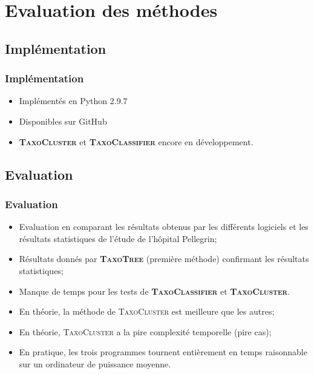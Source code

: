 \documentclass{beamer}
\begin{document}
\section{Evaluation des méthodes}


\subsection{Implémentation}


\begin{frame}
\frametitle{Implémentation}

\begin{itemize}
\item Implémentés en Python 2.9.7
\bigskip
\item Disponibles sur GitHub
\bigskip
\item \textsc{\bf TaxoCluster} et \textsc{\bf TaxoClassifier} encore en développement.
\end{itemize}

\end{frame}

\subsection{Evaluation}


\begin{frame}
\frametitle{Evaluation}

\begin{itemize}
\item Evaluation en comparant les résultats obtenus par les différents logiciels et les résultats statistiques de l'étude de l'hôpital Pellegrin;
\bigskip
\item Résultats donnés par \textsc{\bf TaxoTree} (première méthode) confirmant les résultats statistiques;
\bigskip
\item Manque de temps pour les tests de \textsc{\bf TaxoClassifier} et \textsc{\bf TaxoCluster}.
\bigskip
\item En théorie, la méthode de \textsc{TaxoCluster} est meilleure que les autres;
\bigskip
\item En théorie, \textsc{TaxoCluster} a la pire complexité temporelle (pire cas);
\bigskip
\item En pratique, les trois programmes tournent entièrement en temps raisonnable sur un ordinateur de puissance moyenne.
\end{itemize}

\end{frame}
\end{document}
